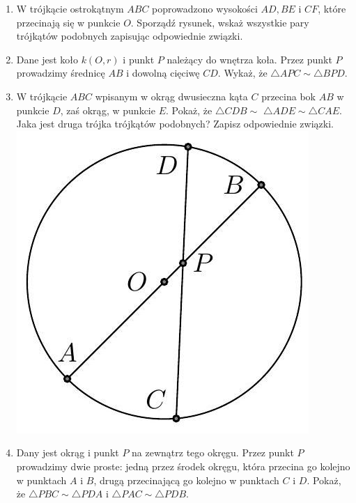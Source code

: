 \documentclass[10pt]{article}
\begin{document}
\begin{enumerate}
  \item W trójkącie ostrokątnym \(A B C\) poprowadzono wysokości \(A D, B E\) i \(C F\), które przecinają się w punkcie \(O\). Sporządź rysunek, wskaż wszystkie pary trójkątów podobnych zapisując odpowiednie związki.
  \item Dane jest koło \(k(O, r)\) i punkt \(P\) należący do wnętrza koła. Przez punkt \(P\) prowadzimy średnicę \(A B\) i dowolną cięciwę \(C D\). Wykaż, że \(\triangle A P C \sim \triangle B P D\).
  \item W trójkącie \(A B C\) wpisanym w okrąg dwusieczna kąta \(C\) przecina bok \(A B\) w punkcie \(D\), zaś okrąg, w punkcie \(E\). Pokaż, że \(\triangle C D B \sim\) \(\triangle A D E \sim \triangle C A E\). Jaka jest druga trójka trójkątów podobnych? Zapisz odpowiednie związki.\\
\includegraphics[max width=\textwidth, center]{2024_11_21_e9b4faa005d5be2cc318g-023}
  \item Dany jest okrąg i punkt \(P\) na zewnątrz tego okręgu. Przez punkt \(P\) prowadzimy dwie proste: jedną przez środek okręgu, która przecina go kolejno w punktach \(A\) i \(B\), drugą przecinającą go kolejno w punktach \(C\) i \(D\). Pokaż, że \(\triangle P B C \sim \triangle P D A\) i \(\triangle P A C \sim \triangle P D B\).
\end{enumerate}
\end{document}
